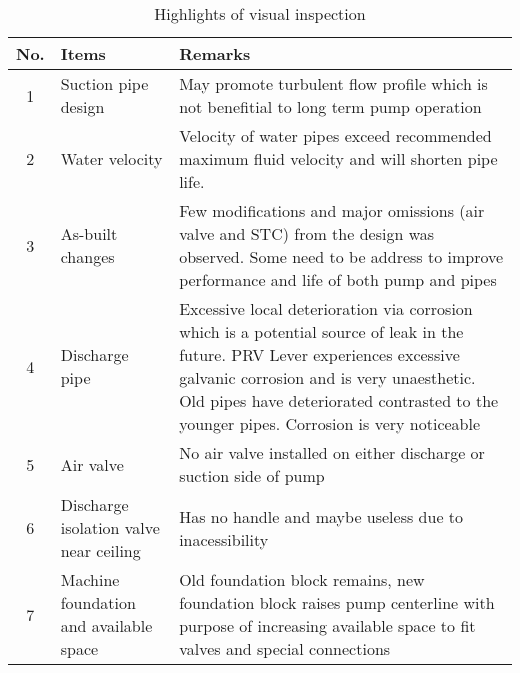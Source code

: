     \begin{table}[!htb]
	\caption{Highlights of visual inspection}
	\label{ch043_tbl_visualinspectionHL}
	{\scriptsize

\begin{tabular}{c|p{3cm}|p{9.5cm}}
\hline
No. & Items & Remarks \\ 
\hline
1 & Suction pipe design & May promote turbulent flow profile which is not benefitial to long term pump operation \\ 
2 & Water velocity & Velocity of water pipes exceed recommended maximum fluid velocity and will shorten pipe life.  \\ 
3 & As-built changes & Few modifications and major omissions (air valve and STC) from the design was observed. Some need to be address to improve performance and life of both pump and pipes \\ 
4 & Discharge pipe & Excessive local deterioration via corrosion which is a potential source of leak in the future. PRV Lever experiences excessive galvanic corrosion and is very unaesthetic. Old pipes have deteriorated contrasted to the younger pipes. Corrosion is very noticeable \\ 
5 & Air valve & No air valve installed on either discharge or suction side of pump \\ 
6 & Discharge isolation valve near ceiling & Has no handle and maybe useless due to inacessibility \\ 
7 & Machine foundation and available space & Old foundation block remains, new foundation block raises pump centerline with purpose of increasing available space to fit valves and special connections \\ 
\hline
\end{tabular}

	}%
\end{table}